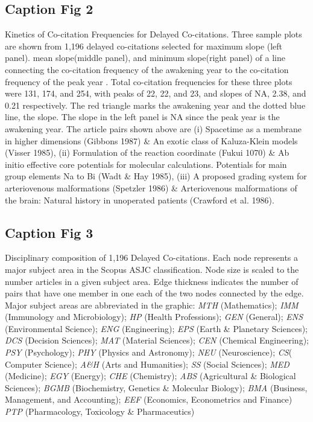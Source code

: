 \documentclass[utf8]{frontiersSCNS}
\begin{document}
\subsection{Caption Fig 2} Kinetics of Co-citation Frequencies for Delayed Co-citations. Three sample plots are shown from 1,196 delayed co-citations selected for maximum slope (left panel). mean slope(middle panel), and minimum slope(right panel) of a line connecting the co-citation frequency of the awakening year to the co-citation frequency of the peak year . Total co-citation frequencies for these three plots were 131, 174, and 254, with peaks of 22, 22, and 23, and slopes of NA, 2.38, and 0.21 respectively. The red triangle marks the awakening year and the dotted blue line, the slope. The slope in the left panel is NA since the peak year is the awakening year. The article pairs shown above are (i) Spacetime as a membrane in higher dimensions (Gibbons 1987) \& An exotic class of Kaluza-Klein models (Visser 1985), (ii) Formulation of the reaction coordinate (Fukui 1070) \& Ab initio effective core potentials for molecular calculations. Potentials for main group elements Na to Bi (Wadt \& Hay 1985), (iii) A proposed grading system for arteriovenous malformations (Spetzler 1986) \& Arteriovenous malformations of the brain: Natural history in unoperated patients (Crawford et al. 1986).

\subsection{Caption Fig 3} Disciplinary composition of 1,196 Delayed Co-citations. Each node represents a major subject area in the Scopus ASJC classification. Node size is scaled to the number articles in a given subject area. Edge thickness indicates the number of pairs that have one member in one each of the two nodes connected by the edge. Major subject areas are abbreviated in the graphic:
\emph{MTH} (Mathematics);
\emph{IMM} (Immunology and Microbiology);
\emph{HP} (Health Professions);
\emph{GEN} (General);
\emph{ENS} (Environmental Science);
\emph{ENG} (Engineering);
\emph{EPS} (Earth \& Planetary Sciences);
\emph{DCS} (Decision Sciences);
\emph{MAT} (Material Sciences);
\emph{CEN} (Chemical Engineering);
\emph{PSY} (Psychology);
\emph{PHY} (Physics and Astronomy);
\emph{NEU} (Neuroscience);
\emph{CS}( Computer Science);
\emph{A\&H} (Arts and Humanities);
\emph{SS} (Social Sciences);
\emph{MED} (Medicine);
\emph{EGY} (Energy);
\emph{CHE} (Chemistry);
\emph{ABS} (Agricultural \& Biological Sciences); 
\emph{BGMB} (Biochemistry, Genetics \& Molecular Biology);
\emph{BMA} (Business, Management, and Accounting);
\emph{EEF} (Economics, Econometrics and Finance)
\emph{PTP} (Pharmacology, Toxicology \& Pharmaceutics)
\end{document}
